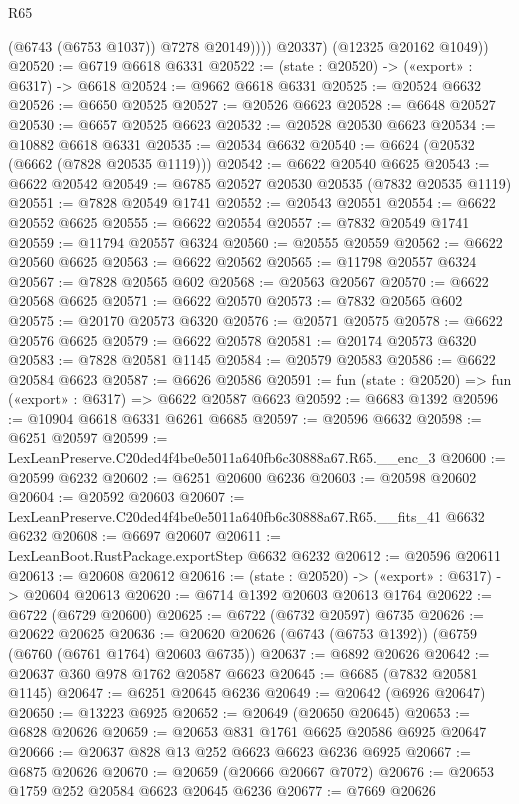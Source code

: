 \begin{lexlean}{R65}
\begin{coremodule}
{                (@6743 (@6753 @1037))
                @7278
                @20149))))
        @20337)
      (@12325 @20162 @1049))
@20520 := @6719 @6618 @6331
@20522 := (state : @20520) -> («export» : @6317) -> @6618
@20524 := @9662 @6618 @6331
@20525 := @20524 @6632
@20526 := @6650 @20525
@20527 := @20526 @6623
@20528 := @6648 @20527
@20530 := @6657 @20525 @6623
@20532 := @20528 @20530 @6623
@20534 := @10882 @6618 @6331
@20535 := @20534 @6632
@20540 := @6624 (@20532 (@6662 (@7828 @20535 @1119)))
@20542 := @6622 @20540 @6625
@20543 := @6622 @20542
@20549 := @6785 @20527 @20530 @20535 (@7832 @20535 @1119)
@20551 := @7828 @20549 @1741
@20552 := @20543 @20551
@20554 := @6622 @20552 @6625
@20555 := @6622 @20554
@20557 := @7832 @20549 @1741
@20559 := @11794 @20557 @6324
@20560 := @20555 @20559
@20562 := @6622 @20560 @6625
@20563 := @6622 @20562
@20565 := @11798 @20557 @6324
@20567 := @7828 @20565 @602
@20568 := @20563 @20567
@20570 := @6622 @20568 @6625
@20571 := @6622 @20570
@20573 := @7832 @20565 @602
@20575 := @20170 @20573 @6320
@20576 := @20571 @20575
@20578 := @6622 @20576 @6625
@20579 := @6622 @20578
@20581 := @20174 @20573 @6320
@20583 := @7828 @20581 @1145
@20584 := @20579 @20583
@20586 := @6622 @20584 @6623
@20587 := @6626 @20586
@20591 := fun (state : @20520) => fun («export» : @6317) => @6622 @20587 @6623
@20592 := @6683 @1392
@20596 := @10904 @6618 @6331 @6261 @6685
@20597 := @20596 @6632
@20598 := @6251 @20597
@20599 := LexLeanPreserve.C20ded4f4be0e5011a640fb6c30888a67.R65.__enc_3
@20600 := @20599 @6232
@20602 := @6251 @20600 @6236
@20603 := @20598 @20602
@20604 := @20592 @20603
@20607 := LexLeanPreserve.C20ded4f4be0e5011a640fb6c30888a67.R65.__fits_41 @6632 @6232
@20608 := @6697 @20607
@20611 := LexLeanBoot.RustPackage.exportStep @6632 @6232
@20612 := @20596 @20611
@20613 := @20608 @20612
@20616 := (state : @20520) -> («export» : @6317) -> @20604 @20613
@20620 := @6714 @1392 @20603 @20613 @1764
@20622 := @6722 (@6729 @20600)
@20625 := @6722 (@6732 @20597) @6735
@20626 := @20622 @20625
@20636 := @20620 @20626 (@6743 (@6753 @1392)) (@6759 (@6760 (@6761 @1764) @20603 @6735))
@20637 := @6892 @20626
@20642 := @20637 @360 @978 @1762 @20587 @6623
@20645 := @6685 (@7832 @20581 @1145)
@20647 := @6251 @20645 @6236
@20649 := @20642 (@6926 @20647)
@20650 := @13223 @6925
@20652 := @20649 (@20650 @20645)
@20653 := @6828 @20626
@20659 := @20653 @831 @1761 @6625 @20586 @6925 @20647
@20666 := @20637 @828 @13 @252 @6623 @6623 @6236 @6925
@20667 := @6875 @20626
@20670 := @20659 (@20666 @20667 @7072)
@20676 := @20653 @1759 @252 @20584 @6623 @20645 @6236
@20677 := @7669 @20626
}
\end{coremodule}
\end{lexlean}
